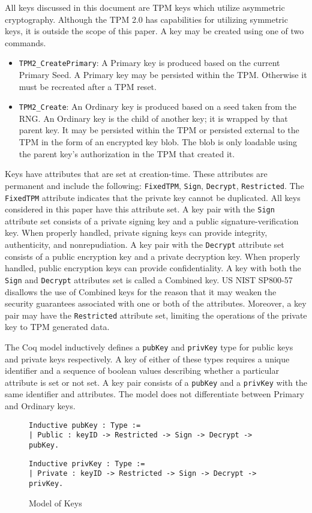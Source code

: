 All keys discussed in this document are TPM keys which utilize asymmetric cryptography. Although the TPM 2.0 has capabilities for utilizing symmetric keys, it is outside the scope of this paper. A key may be created using one of two commands.
\begin{itemize}
  \item \verb|TPM2_CreatePrimary|: A Primary key is produced based on the current Primary Seed. A Primary key may be persisted within the TPM. Otherwise it must be recreated after a TPM reset.
  \item \verb|TPM2_Create|: An Ordinary key is produced based on a seed taken from the RNG. An Ordinary key is the child of another key; it is wrapped by that parent key. It may be persisted within the TPM or persisted external to the TPM in the form of an encrypted key blob. The blob is only loadable using the parent key's authorization in the TPM that created it.
\end{itemize}

Keys have attributes that are set at creation-time. These attributes are permanent and include the following: \verb|FixedTPM|, \verb|Sign|, \verb|Decrypt|, \verb|Restricted|. The \verb|FixedTPM| attribute indicates that the private key cannot be duplicated. All keys considered in this paper have this attribute set. A key pair with the \verb|Sign| attribute set consists of a private signing key and a public signature-verification key. When properly handled, private signing keys can provide integrity, authenticity, and nonrepudiation. A key pair with the \verb|Decrypt| attribute set consists of a public encryption key and a private decryption key. When properly handled, public encryption keys can provide confidentiality. A key with both the \verb|Sign| and \verb|Decrypt| attributes set is called a Combined key. US NIST SP800-57 disallows the use of Combined keys for the reason that it may weaken the security guarantees associated with one or both of the attributes. Moreover, a key pair may have the \verb|Restricted| attribute set, limiting the operations of the private key to TPM generated data.

The Coq model inductively defines a \verb|pubKey| and \verb|privKey| type for public keys and private keys respectively. A key of either of these types requires a unique identifier and a sequence of boolean values describing whether a particular attribute is set or not set. A key pair consists of a \verb|pubKey| and a \verb|privKey| with the same identifier and attributes. The model does not differentiate between Primary and Ordinary keys.
\begin{figure}[h]
  \begin{lstlisting}[language=Coq]
Inductive pubKey : Type :=
| Public : keyID -> Restricted -> Sign -> Decrypt -> pubKey.
\end{lstlisting}

\begin{lstlisting}[language=Coq]
Inductive privKey : Type :=
| Private : keyID -> Restricted -> Sign -> Decrypt -> privKey.
\end{lstlisting}

\caption{Model of Keys}
\end{figure}


